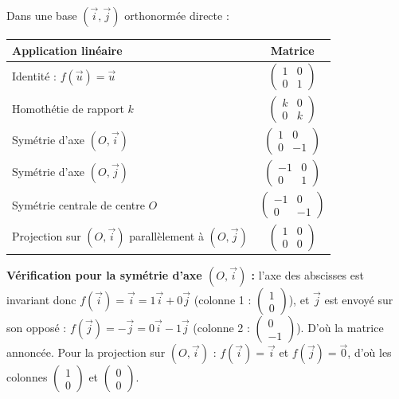 \documentclass[11pt]{article}
\begin{document}
\begin{exemplebox}
Dans une base $(\vec{i},\vec{j})$ orthonormée directe :
\begin{center}
\begin{tabularx}{\linewidth}{|X|c|}
\hline
\rowcolor{popblueL} \textbf{Application linéaire} & \textbf{Matrice} \\
\hline
Identité : $f(\vec{u})=\vec{u}$ & $\begin{pmatrix} 1 & 0 \\ 0 & 1 \end{pmatrix}$ \\
\hline
Homothétie de rapport $k$ & $\begin{pmatrix} k & 0 \\ 0 & k \end{pmatrix}$ \\
\hline
Symétrie d'axe $(O,\vec{i})$ & $\begin{pmatrix} 1 & 0 \\ 0 & -1 \end{pmatrix}$ \\
\hline
Symétrie d'axe $(O,\vec{j})$ & $\begin{pmatrix} -1 & 0 \\ 0 & 1 \end{pmatrix}$ \\
\hline
Symétrie centrale de centre $O$ & $\begin{pmatrix} -1 & 0 \\ 0 & -1 \end{pmatrix}$ \\
\hline
Projection sur $(O,\vec{i})$ parallèlement à $(O,\vec{j})$ & $\begin{pmatrix} 1 & 0 \\ 0 & 0 \end{pmatrix}$ \\
\hline
\end{tabularx}
\end{center}
\textbf{Vérification pour la symétrie d'axe $(O,\vec{i})$ :} l'axe des abscisses est invariant donc $f(\vec{i}) = \vec{i} = 1\vec{i}+0\vec{j}$ (colonne 1 : $\begin{pmatrix} 1 \\ 0 \end{pmatrix}$), et $\vec{j}$ est envoyé sur son opposé : $f(\vec{j}) = -\vec{j} = 0\vec{i}-1\vec{j}$ (colonne 2 : $\begin{pmatrix} 0 \\ -1 \end{pmatrix}$). D'où la matrice annoncée. Pour la projection sur $(O,\vec{i})$ : $f(\vec{i})=\vec{i}$ et $f(\vec{j})=\vec{0}$, d'où les colonnes $\begin{pmatrix} 1 \\ 0 \end{pmatrix}$ et $\begin{pmatrix} 0 \\ 0 \end{pmatrix}$.
\end{exemplebox}
\end{document}
